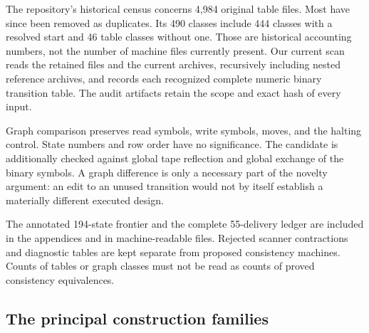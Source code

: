 \documentclass[11pt,letterpaper]{article}
\begin{document}
The repository's historical census concerns 4,984 original table files.
Most have since been removed as duplicates. Its 490 classes include 444
classes with a resolved start and 46 table classes without one. Those are
historical accounting numbers, not the number of machine files currently
present. Our current scan reads the retained files and the current archives,
recursively including nested reference archives, and records each recognized
complete numeric binary transition table. The audit artifacts retain the
scope and exact hash of every input.

Graph comparison preserves read symbols, write symbols, moves, and the
halting control. State numbers and row order have no significance.
The candidate is additionally checked against global tape reflection and
global exchange of the binary symbols. A graph difference is only a
necessary part of the novelty argument: an edit to an unused transition
would not by itself establish a materially different executed design.



The annotated 194-state frontier and the complete 55-delivery ledger are
included in the appendices and in machine-readable files. Rejected scanner
contractions and diagnostic tables are kept separate from proposed
consistency machines. Counts of tables or graph classes must not be read
as counts of proved consistency equivalences.

\subsection{The principal construction families}
\end{document}
